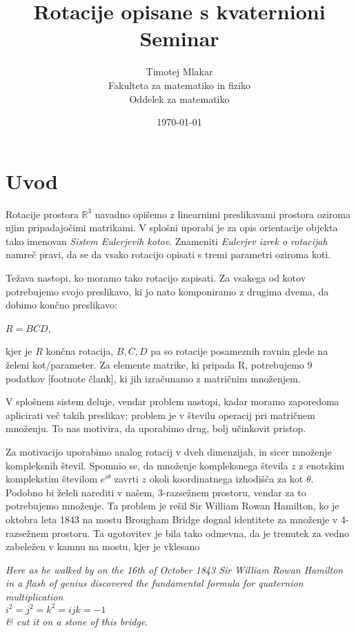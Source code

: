 \documentclass[a4paper,12pt]{article}
\title{Rotacije opisane s kvaternioni \\ 
\Large Seminar}
\author{Timotej Mlakar \\
Fakulteta za matematiko in fiziko \\
Oddelek za matematiko}
\date{\today}
\def\R{\mathbb{R}} %
\begin{document}


\maketitle



\section{Uvod}

Rotacije prostora $\R^3$ navadno opišemo z linearnimi preslikavami prostora oziroma njim pripadajočimi matrikami.
V splošni uporabi je za opis orientacije objekta tako imenovan \emph{Sistem Eulerjevih kotov}. Znameniti \emph{Eulerjev izrek o rotacijah} namreč pravi,
da se da vsako rotacijo opisati s tremi parametri oziroma koti.

Težava nastopi, ko moramo tako rotacijo zapisati. Za vsakega od kotov potrebujemo svojo preslikavo, ki jo
nato komponiramo z drugima dvema, da dobimo končno preslikavo:
\begin{center}
   $R = BCD$,
\end{center}
kjer je $R$ končna rotacija, $B, C, D$ pa so rotacije posameznih ravnin glede na želeni kot/parameter.
Za elemente matrike, ki pripada R, potrebujemo 9  podatkov [footnote člank], ki jih izračunamo z matričnim množenjem.

V splošnem sistem deluje, vendar problem nastopi, kadar moramo zaporedoma aplicirati več takih preslikav; 
problem je v številu operacij pri matričnem množenju. To nas motivira, da uporabimo drug, bolj učinkovit pristop.

Za motivacijo uporabimo analog rotacij v dveh dimenzijah, in sicer množenje kompleksnih števil.
Spomnio se, da množenje kompleksnega števila $z$ z enotskim komplekstim številom $e^{i\theta}$ zavrti $z$ okoli koordinatnega izhodišča za kot $\theta$.
Podobno bi želeli narediti v našem, 3-razsežnem prostoru, vendar za to potrebujemo množenje.
Ta problem je rešil Sir William Rowan Hamilton, ko je oktobra leta 1843 na mostu Brougham Bridge dognal identitete za množenje v 4-razsežnem prostoru.
Ta ugotovitev je bila tako odmevna, da je trenutek za vedno zabeležen v kamnu na mostu, kjer je vklesano
\begin{center}
   \emph{ Here as he walked by
   on the 16th of October 1843
   Sir William Rowan Hamilton
   in a flash of genius discovered
   the fundamental formula for
   quaternion multiplication}\\
   $i^2 = j^2 = k^2 = ijk = -1$\\
   \emph{ \& cut it on a stone of this bridge}.
\end{center}
\end{document}
